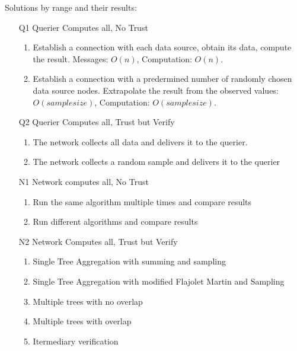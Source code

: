 \documentclass[11pt,twocolumn]{MyTightStyle}
\theoremstyle{plain}
\theoremstyle{definition}
\theoremstyle{remark}
\numberwithin{equation}{section}
\begin{document}
Solutions by range and their results:

\begin{enumerate}
  \item [Q1] Querier Computes all, No Trust
    \begin{enumerate}
      \item Establish a connection with each data source, obtain its
      data, compute the result. Messages: $O(n)$, Computation: $O(n)$.
      
      \item Establish a connection with a predermined number of
      randomly chosen data source nodes. Extrapolate the result from
      the observed values: $O(sample size)$, Computation: $O(sample size)$.
      
    \end{enumerate}
  \item [Q2] Querier Computes all, Trust but Verify
    \begin{enumerate}
      
      \item The network collects all data and delivers it to the
      querier.

    \item The network collects a random sample and delivers it to
      the querier
    \end{enumerate}
  \item [N1] Network computes all, No Trust
    \begin{enumerate}
      \item Run the same algorithm multiple times and compare results
      \item Run different algorithms and compare results
    \end{enumerate}
  \item [N2] Network Computes all, Trust but Verify
    \begin{enumerate}
      \item Single Tree Aggregation with summing and sampling
      \item Single Tree Aggregation with modified Flajolet Martin
        and Sampling
      \item Multiple trees with no overlap
      \item Multiple trees with overlap
      \item Itermediary verification
    \end{enumerate}  
\end{enumerate}
\end{document}
